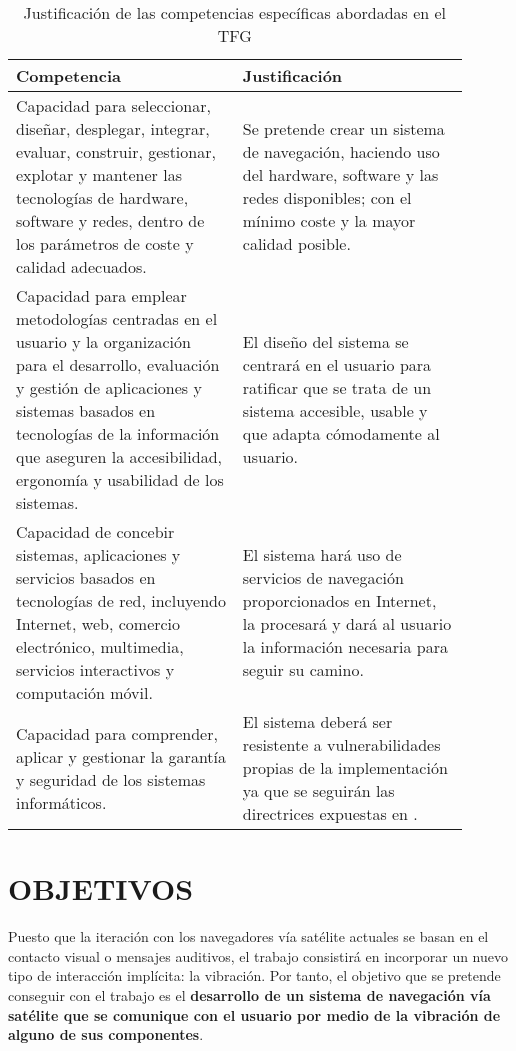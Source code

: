 \documentclass{pre-tfg}
\begin{document}
\begin{spacing}{1.1}
\begin{longtable}{p{0.45\linewidth}p{0.45\linewidth}}
  \caption{Justificación de las competencias específicas abordadas en el TFG}
  \label{tab:competencias} \\

  \textbf{Competencia} & \textbf{Justificación} \\
  \hline
  \hline
    Capacidad para seleccionar, diseñar, desplegar, integrar, evaluar, construir, gestionar, explotar y mantener las tecnologías de hardware, software y redes, dentro de los parámetros de coste y calidad adecuados. & Se pretende crear un sistema de navegación, haciendo uso del hardware, software y las redes disponibles; con el mínimo coste y la mayor calidad posible.\\

    Capacidad para emplear metodologías centradas en el usuario y la organización para el desarrollo, evaluación y gestión de aplicaciones y sistemas basados en tecnologías de la información que aseguren la accesibilidad, ergonomía y usabilidad de los sistemas. & El diseño del sistema se centrará en el usuario para ratificar que se trata de un sistema accesible, usable y que adapta cómodamente al usuario.\\

    Capacidad de concebir sistemas, aplicaciones y servicios basados en tecnologías de red, incluyendo Internet, web, comercio electrónico, multimedia, servicios interactivos y computación móvil. & El sistema hará uso de servicios de navegación proporcionados en Internet, la procesará y dará al usuario la información necesaria para seguir su camino.\\

    Capacidad para comprender, aplicar y gestionar la garantía y seguridad de los sistemas informáticos. & El sistema deberá ser resistente a vulnerabilidades propias de la implementación ya que se seguirán las directrices expuestas en \cite{Moreno13}.\\

  \hline
\end{longtable}
\end{spacing}

\section{OBJETIVOS}

Puesto que la iteración con los navegadores vía satélite actuales se basan en el contacto visual o mensajes auditivos, el trabajo consistirá en incorporar un nuevo tipo de interacción implícita: la vibración. Por tanto, el objetivo que se pretende conseguir con el trabajo es el \textbf{desarrollo de un sistema de navegación vía satélite que se comunique con el usuario por medio de la vibración de alguno de sus componentes}.
\end{document}
